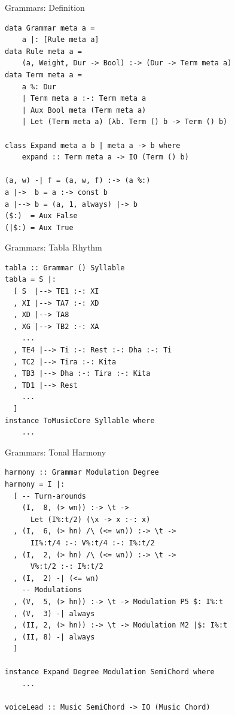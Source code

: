 \documentclass{beamer}
\begin{document}
	\begin{frame}[fragile=singleslide]{Grammars: Definition}
	\begin{verbatim}
data Grammar meta a =
    a |: [Rule meta a]
data Rule meta a =
    (a, Weight, Dur -> Bool) :-> (Dur -> Term meta a)
data Term meta a =
    a %: Dur
    | Term meta a :-: Term meta a
    | Aux Bool meta (Term meta a)
    | Let (Term meta a) (λb. Term () b -> Term () b)

class Expand meta a b | meta a -> b where
    expand :: Term meta a -> IO (Term () b)

(a, w) -| f = (a, w, f) :-> (a %:)
a |->  b = a :-> const b
a |--> b = (a, 1, always) |-> b
($:)  = Aux False
(|$:) = Aux True
	\end{verbatim}
	\end{frame}
	
	\begin{frame}[fragile=singleslide]{Grammars: Tabla Rhythm}
	\begin{verbatim}
tabla :: Grammar () Syllable
tabla = S |:
  [ S  |--> TE1 :-: XI
  , XI |--> TA7 :-: XD
  , XD |--> TA8
  , XG |--> TB2 :-: XA
    ...
  , TE4 |--> Ti :-: Rest :-: Dha :-: Ti
  , TC2 |--> Tira :-: Kita
  , TB3 |--> Dha :-: Tira :-: Kita
  , TD1 |--> Rest
    ...
  ]
instance ToMusicCore Syllable where
    ...
	\end{verbatim}
	\end{frame}
	
	\begin{frame}[fragile=singleslide]{Grammars: Tonal Harmony}
	\begin{verbatim}
harmony :: Grammar Modulation Degree
harmony = I |:
  [ -- Turn-arounds
    (I,  8, (> wn)) :-> \t ->
      Let (I%:t/2) (\x -> x :-: x)
  , (I,  6, (> hn) /\ (<= wn)) :-> \t ->
      II%:t/4 :-: V%:t/4 :-: I%:t/2
  , (I,  2, (> hn) /\ (<= wn)) :-> \t ->
      V%:t/2 :-: I%:t/2
  , (I,  2) -| (<= wn)
    -- Modulations
  , (V,  5, (> hn)) :-> \t -> Modulation P5 $: I%:t
  , (V,  3) -| always
  , (II, 2, (> hn)) :-> \t -> Modulation M2 |$: I%:t
  , (II, 8) -| always
  ]

instance Expand Degree Modulation SemiChord where
    ...

voiceLead :: Music SemiChord -> IO (Music Chord)
	\end{verbatim}
	\end{frame}	
	
\end{document}
